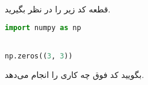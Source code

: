 قطعه کد زیر را در نظر بگیرید.

\begin{latin}
\begin{lstlisting}[style=codestyle, language=Python]
import numpy as np


np.zeros((3, 3))
\end{lstlisting}
\end{latin}

بگویید کد فوق چه کاری را انجام می‌دهد.